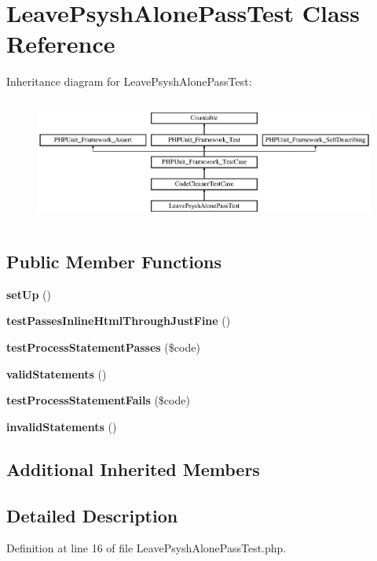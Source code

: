 \section{Leave\+Psysh\+Alone\+Pass\+Test Class Reference}
\label{class_psy_1_1_test_1_1_code_cleaner_1_1_leave_psysh_alone_pass_test}
Inheritance diagram for Leave\+Psysh\+Alone\+Pass\+Test\+:\begin{figure}[H]
\begin{center}
\leavevmode
\includegraphics[height=4.129793cm]{class_psy_1_1_test_1_1_code_cleaner_1_1_leave_psysh_alone_pass_test}
\end{center}
\end{figure}
\subsection*{Public Member Functions}
\begin{DoxyCompactItemize}
\item 
{\bf set\+Up} ()
\item 
{\bf test\+Passes\+Inline\+Html\+Through\+Just\+Fine} ()
\item 
{\bf test\+Process\+Statement\+Passes} (\$code)
\item 
{\bf valid\+Statements} ()
\item 
{\bf test\+Process\+Statement\+Fails} (\$code)
\item 
{\bf invalid\+Statements} ()
\end{DoxyCompactItemize}
\subsection*{Additional Inherited Members}


\subsection{Detailed Description}


Definition at line 16 of file Leave\+Psysh\+Alone\+Pass\+Test.\+php.



